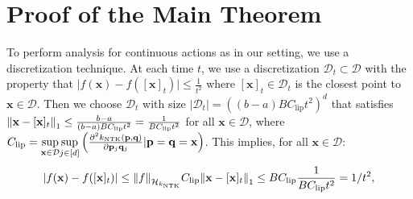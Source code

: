  \section{Proof of the Main Theorem}
To perform analysis for continuous actions as in our setting, we use a discretization technique. At each time $t$, we use a discretization $\mathcal{D}_t \subset \mathcal{D}$ with the property that $\lvert f(\mathbf{x}) - f([\mathbf{x}]_t) \rvert \leq \frac{1}{t^2}$ where $[\mathbf{x}]_t \in \mathcal{D}_t$ is the closest point to $\mathbf{x} \in \mathcal{D}$. Then we choose $\mathcal{D}_t $ 
with size $\lvert \mathcal{D}_t \rvert = \left( (b-a)BC_{\text{lip}}t^2 \right)^d$ that satisfies $\norm{\mathbf{x} - [\mathbf{x}]_t}_1 \leq \frac{b-a}{(b-a)BC_{\text{lip}}t^2} = \frac{1}{BC_{\text{lip}}t^2}$ for all $\mathbf{x} \in \mathcal{D}$,
where $C_{\text{lip}}= \underset{\mathbf{x} \in \mathcal{D}} {\operatorname*{sup}} \underset{j \in [d]} {\operatorname*{sup}} \left( \frac{\partial^2 k_\text{NTK}(\mathbf{p},\mathbf{q})}{\partial \mathbf{p}_j \mathbf{q}_j} \lvert \mathbf{p}=\mathbf{q}=\mathbf{x} \right)$. This implies, for all $\mathbf{x} \in \mathcal{D}$:
\begin{equation}
\label{eqn:rkhs_lipschitz}
    \lvert f(\mathbf{x}) - f([\mathbf{x}]_t) \rvert \leq \norm{f}_{\mathcal{H}_{k_\textup{NTK}}} C_{\text{lip}} \norm{\mathbf{x} - [\mathbf{x}]_t}_1 \leq BC_{\text{lip}} \frac{1}{BC_{\text{lip}}t^2} =  1/t^2, 
\end{equation}
